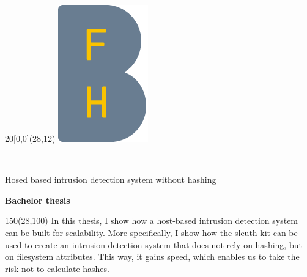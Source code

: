 %
%

\begin{titlepage}


\setlength{\unitlength}{1mm}
\begin{textblock}{20}[0,0](28,12)
	\includegraphics[scale=1.0]{../img/BFH_Logo_B.png}
\end{textblock}

\begin{flushleft}

\vspace*{21mm}

\fontsize{26pt}{40pt}\selectfont 
\heading				\\							%
\vspace{2mm}

\fontsize{16pt}{24pt}\selectfont\vspace{0.3em}
Hosed based intrusion detection system without hashing			\\				%
\vspace{5mm}

\fontsize{10pt}{12pt}\selectfont
\textbf{Bachelor thesis} \\		%
\vspace{7mm}

\begin{textblock}{150}(28,100)
\fontsize{10pt}{12pt}\selectfont
In this thesis, I show how a host-based intrusion detection system can be built for scalability. More specifically, I show how the sleuth kit can be used to create an intrusion detection system that does not rely on hashing, but on filesystem attributes. This way, it gains speed, which enables us to take the risk not to calculate hashes.
\end{textblock}


\end{flushleft}
\end{titlepage}
